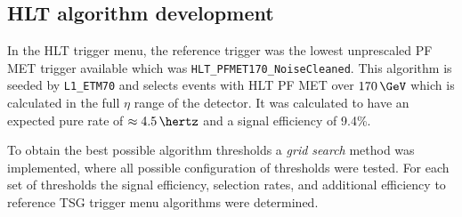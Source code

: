 \subsection{HLT algorithm development}
\label{SECTION:RunIITriggerStudies_HLTAlgorithmDevelopment}


In the \gls{HLT} trigger menu, the reference trigger was the lowest unprescaled \gls{PF} \gls{MET} trigger available which was \verb|HLT_PFMET170_NoiseCleaned|. This algorithm is seeded by \verb|L1_ETM70| and selects events with \gls{HLT} \gls{PF} \gls{MET} over $170\,\GeV$ which is calculated in the full $\eta$ range of the detector. It was calculated to have an expected pure rate of $\approx 4.5\,\hertz$ and a signal efficiency of 9.4\%. 

To obtain the best possible algorithm thresholds a \textit{grid search} method was implemented, where all possible configuration of thresholds were tested. For each set of thresholds the signal efficiency, selection rates, and additional efficiency to reference \gls{TSG} trigger menu algorithms were determined. 


%   
%   

